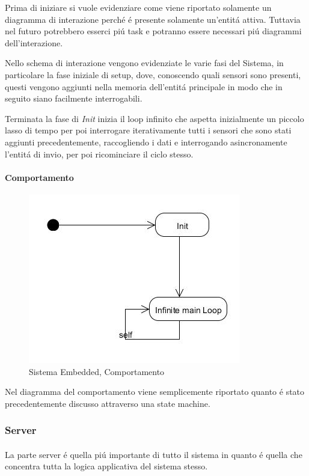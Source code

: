 Prima di iniziare si vuole evidenziare come viene riportato solamente un diagramma di interazione perch\'e \'e presente solamente un'entit\'a attiva. Tuttavia nel futuro potrebbero esserci pi\'u task e potranno essere necessari pi\'u diagrammi dell'interazione.

Nello schema di interazione vengono evidenziate le varie fasi del Sistema, in particolare la fase iniziale di setup, dove, conoscendo quali sensori sono presenti, questi vengono aggiunti nella memoria dell'entit\'a principale in modo che in seguito siano facilmente interrogabili.

Terminata la fase di \textit{Init} inizia il loop infinito che aspetta inizialmente un piccolo lasso di tempo per poi interrogare iterativamente tutti i sensori che sono stati aggiunti precedentemente, raccogliendo i dati e interrogando asincronamente l'entit\'a di invio, per poi ricominciare il ciclo stesso.

\paragraph{Comportamento}

\begin{figure}[h]
\centering
\includegraphics[scale=0.5]{Figures/DomainModel/EmbeddedSystem/Behaviour}
\caption{Sistema Embedded, Comportamento}
\end{figure}


Nel diagramma del comportamento viene semplicemente riportato quanto \'e stato precedentemente discusso attraverso una state machine.

\subsubsection{Server}

\paragraph{}La parte server \'e quella pi\'u importante di tutto il sistema in quanto \'e quella che concentra tutta la logica applicativa del sistema stesso.

